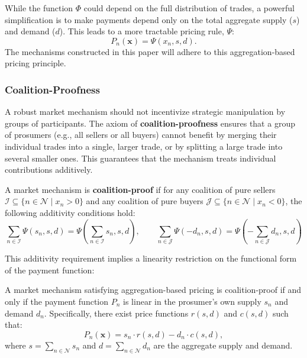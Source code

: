 \documentclass[12pt, notitlepage]{article}
\begin{document}
While the function $\Phi$ could depend on the full distribution of trades, a powerful simplification is to make payments depend only on the total aggregate supply ($s$) and demand ($d$). This leads to a more tractable pricing rule, $\Psi$:
\[
P_n(\bm{x}) = \Psi(x_n, s, d).
\]
The mechanisms constructed in this paper will adhere to this aggregation-based pricing principle.





\subsubsection{Coalition-Proofness}

A robust market mechanism should not incentivize strategic manipulation by groups of participants. The axiom of \textbf{coalition-proofness} ensures that a group of prosumers (e.g., all sellers or all buyers) cannot benefit by merging their individual trades into a single, larger trade, or by splitting a large trade into several smaller ones. This guarantees that the mechanism treats individual contributions additively.

\begin{axiom}
A market mechanism is \textbf{coalition-proof} if for any coalition of pure sellers $\mathcal{I} \subseteq \{n \in \mathcal{N} \mid x_n > 0\}$ and any coalition of pure buyers $\mathcal{J} \subseteq \{n \in \mathcal{N} \mid x_n < 0\}$, the following additivity conditions hold:
\begin{equation}
\sum_{n \in \mathcal{I}} \Psi(s_n, s, d) = \Psi\left(\sum_{n \in \mathcal{I}} s_n, s, d\right),  \qquad
\sum_{n \in \mathcal{J}} \Psi(-d_n, s, d) = \Psi\left(-\sum_{n \in \mathcal{J}} d_n, s, d\right) \label{eq:cproof}
\end{equation}
\end{axiom}
\noindent{}This additivity requirement implies a linearity restriction on the functional form of the payment function:

\begin{proposition}
\label{prop:affine-payment}
A market mechanism satisfying aggregation-based pricing is coalition-proof if and only if the payment function $P_n$ is linear in the prosumer’s own supply $s_n$ and demand $d_n$. Specifically, there exist price functions $r(s,d)$ and $c(s,d)$ such that:
\[
P_n(\bm{x}) = s_n \cdot r(s,d) - d_n \cdot c(s,d),
\]
where $s = \sum_{n \in \mathcal{N}} s_n$ and $d = \sum_{n \in \mathcal{N}} d_n$ are the aggregate supply and demand.
\end{proposition}
\end{document}
